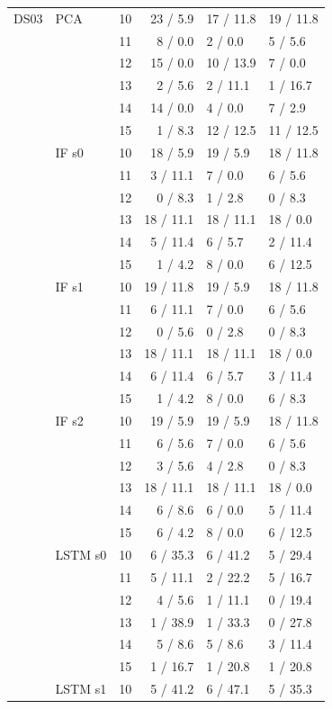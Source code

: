 \begin{scriptsize}
\begin{longtable}{lllrll}
\midrule
DS03 & PCA & 10 & 23 / 5.9 & 17 / 11.8 & 19 / 11.8 \\
 &  & 11 & 8 / 0.0 & 2 / 0.0 & 5 / 5.6 \\
 &  & 12 & 15 / 0.0 & 10 / 13.9 & 7 / 0.0 \\
 &  & 13 & 2 / 5.6 & 2 / 11.1 & 1 / 16.7 \\
 &  & 14 & 14 / 0.0 & 4 / 0.0 & 7 / 2.9 \\
 &  & 15 & 1 / 8.3 & 12 / 12.5 & 11 / 12.5 \\
 & IF s0 & 10 & 18 / 5.9 & 19 / 5.9 & 18 / 11.8 \\
 &  & 11 & 3 / 11.1 & 7 / 0.0 & 6 / 5.6 \\
 &  & 12 & 0 / 8.3 & 1 / 2.8 & 0 / 8.3 \\
 &  & 13 & 18 / 11.1 & 18 / 11.1 & 18 / 0.0 \\
 &  & 14 & 5 / 11.4 & 6 / 5.7 & 2 / 11.4 \\
 &  & 15 & 1 / 4.2 & 8 / 0.0 & 6 / 12.5 \\
 & IF s1 & 10 & 19 / 11.8 & 19 / 5.9 & 18 / 11.8 \\
 &  & 11 & 6 / 11.1 & 7 / 0.0 & 6 / 5.6 \\
 &  & 12 & 0 / 5.6 & 0 / 2.8 & 0 / 8.3 \\
 &  & 13 & 18 / 11.1 & 18 / 11.1 & 18 / 0.0 \\
 &  & 14 & 6 / 11.4 & 6 / 5.7 & 3 / 11.4 \\
 &  & 15 & 1 / 4.2 & 8 / 0.0 & 6 / 8.3 \\
 & IF s2 & 10 & 19 / 5.9 & 19 / 5.9 & 18 / 11.8 \\
 &  & 11 & 6 / 5.6 & 7 / 0.0 & 6 / 5.6 \\
 &  & 12 & 3 / 5.6 & 4 / 2.8 & 0 / 8.3 \\
 &  & 13 & 18 / 11.1 & 18 / 11.1 & 18 / 0.0 \\
 &  & 14 & 6 / 8.6 & 6 / 0.0 & 5 / 11.4 \\
 &  & 15 & 6 / 4.2 & 8 / 0.0 & 6 / 12.5 \\
 & LSTM s0 & 10 & 6 / 35.3 & 6 / 41.2 & 5 / 29.4 \\
 &  & 11 & 5 / 11.1 & 2 / 22.2 & 5 / 16.7 \\
 &  & 12 & 4 / 5.6 & 1 / 11.1 & 0 / 19.4 \\
 &  & 13 & 1 / 38.9 & 1 / 33.3 & 0 / 27.8 \\
 &  & 14 & 5 / 8.6 & 5 / 8.6 & 3 / 11.4 \\
 &  & 15 & 1 / 16.7 & 1 / 20.8 & 1 / 20.8 \\
 & LSTM s1 & 10 & 5 / 41.2 & 6 / 47.1 & 5 / 35.3 \\

\end{longtable}
\end{scriptsize}
